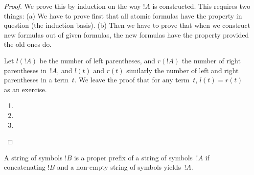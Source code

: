 \documentclass[../../include/open-logic-section]{subfiles}
\begin{document}
\begin{proof}
We prove this by induction on the way $!A$ is constructed. This
requires two things: (a) We have to prove first that all atomic
formulas have the property in question (the induction basis). (b) Then
we have to prove that when we construct new formulas out of given
formulas, the new formulas have the property provided the old ones do.

Let $l(!A)$ be the number of left parentheses, and $r(!A)$ the number
of right parentheses in~$!A$, and $l(t)$ and $r(t)$ similarly the
number of left and right parentheses in a term~$t$.  We leave the
proof that for any term~$t$, $l(t) = r(t)$ as an exercise.

\begin{enumerate}

\item {}

\item {}


\item {}



\end{enumerate}
\end{proof}

\begin{defn}
A string of symbols $!B$ is a proper prefix of a string of symbols~$!A$ if
concatenating $!B$ and a non-empty string of symbols yields~$!A$.
\end{defn}
\end{document}
